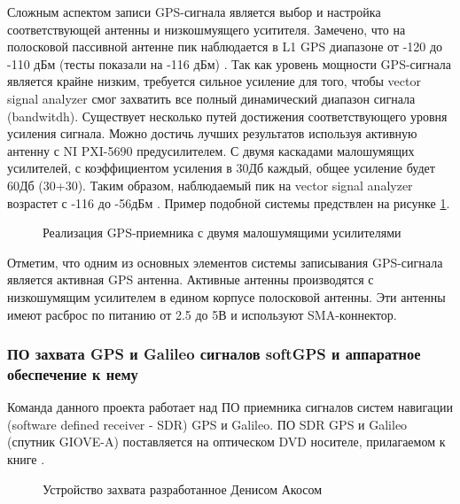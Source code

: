 Сложным аспектом записи GPS-сигнала является выбор и настройка соответствующей антенны и низкошмуящего уситителя.
Замечено, что на полосковой пассивной антенне пик наблюдается в L1 GPS диапазоне от -120 до -110 дБм
(тесты показали на -116 дБм) \cite{ni_article}. Так как уровень
мощности GPS-сигнала является крайне низким, требуется сильное усиление для того, чтобы vector signal
analyzer смог захватить все полный динамический диапазон сигнала (bandwitdh). Существует несколько путей достижения
соответствующего уровня усиления сигнала. Можно достичь лучших результатов используя активную антенну с NI PXI-5690
предусилителем. С двумя каскадами малошумящих усилителей, с коэффициентом усиления в 30Дб каждый, общее усиление будет
60Дб (30+30). Таким образом, наблюдаемый пик на vector signal analyzer возрастет с -116 до -56дБм \cite{ni_article}.
Пример подобной системы предствлен на рисунке \ref{pic:ni_gps_receiver}.

\begin{figure}[H]
\begin{center}
\end{center}
\caption{Реализация GPS-приемника с двумя малошумящими усилителями}
\label{pic:ni_gps_receiver}
\end{figure}

Отметим, что одним из основных элементов системы записывания GPS-сигнала является активная GPS антенна. Активные антенны
производятся с низкошумящим усилителем в едином корпусе полосковой антенны. Эти антенны имеют расброс по питанию от 2.5 до
5В и используют SMA-коннектор. 

\subsubsection*{ПО захвата GPS и Galileo сигналов softGPS и аппаратное обеспечение к нему}
Команда данного проекта работает над ПО приемника сигналов систем навигации (software defined receiver - SDR) GPS и Galileo. ПО SDR
GPS и Galileo (спутник GIOVE-A) поставляется на оптическом DVD носителе, прилагаемом к книге \cite{gps}.

\begin{figure}[H]
\begin{center}
\end{center}
\caption{Устройство захвата разработанное Денисом Акосом}
\label{pic:softGPS}
\end{figure}

